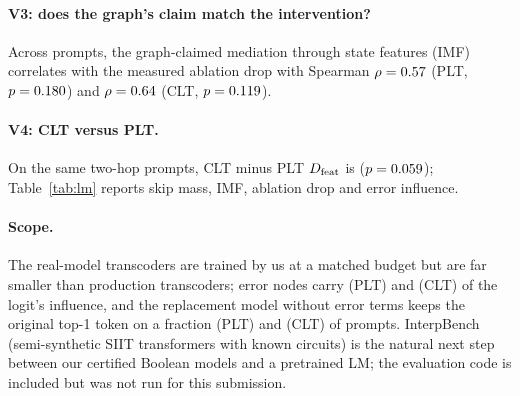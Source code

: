 \paragraph{V3: does the graph's claim match the intervention?}
Across prompts, the graph-claimed mediation through state features (IMF) correlates with the measured ablation
drop with Spearman $\rho=0.57$ (PLT, $p=0.180$) and $\rho=0.64$ (CLT, $p=0.119$).

\paragraph{V4: CLT versus PLT.}
On the same two-hop prompts, CLT minus PLT $D_{\mathrm{feat}}$ is \LMDfeatDiffCLTminusPLT{} ($p=0.059$);
Table~\ref{tab:lm} reports skip mass, IMF, ablation drop and error influence.



\paragraph{Scope.} The real-model transcoders are trained by us at a matched budget but are far smaller than
production transcoders; error nodes carry \LMErrInflPLT{} (PLT) and \LMErrInflCLT{} (CLT) of the logit's
influence, and the replacement model without error terms keeps the original top-1 token on a fraction
\LMTopKeptPLT{} (PLT) and \LMTopKeptCLT{} (CLT) of prompts. InterpBench~\cite{gupta2024interpbench}
(semi-synthetic SIIT transformers with known circuits) is the natural next step between our certified
Boolean models and a pretrained LM; the evaluation code is included but was not run for this submission.
